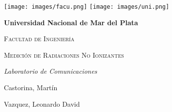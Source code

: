 

\raggedright
{\texttt{[image: images/facu.png]}}
\hspace{10.5cm}
{\texttt{[image: images/uni.png]}}
\vspace{1cm}


\centering
{\bfseries\LARGE Universidad Nacional de Mar del Plata \par}
\vspace{1cm}
{\scshape\Large Facultad de Ingeniería \par}
\vspace{3cm}

{\scshape\Huge Medición de Radiaciones No Ionizantes\par}
\vspace{1cm}
{\itshape\Large Laboratorio de Comunicaciones \par}
\vfill
\vfill
{\Large Castorina, Martín \par}
\vspace{1cm}
{\Large Vazquez, Leonardo David \par}
\vspace{1cm}
\vfill
